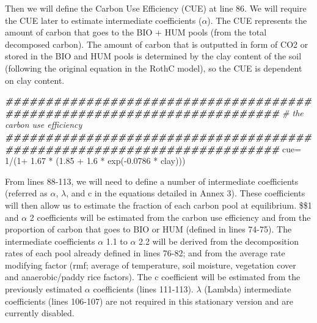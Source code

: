 \documentclass[
  10pt,
  b5paper,
]{book}
\newenvironment{Shaded}{\begin{snugshade}}{\end{snugshade}}
\newcommand{\CommentTok}[1]{\textcolor[rgb]{0.56,0.35,0.01}{\textit{#1}}}
\newcommand{\DecValTok}[1]{\textcolor[rgb]{0.00,0.00,0.81}{#1}}
\newcommand{\DocumentationTok}[1]{\textcolor[rgb]{0.56,0.35,0.01}{\textbf{\textit{#1}}}}
\newcommand{\FloatTok}[1]{\textcolor[rgb]{0.00,0.00,0.81}{#1}}
\newcommand{\FunctionTok}[1]{\textcolor[rgb]{0.00,0.00,0.00}{#1}}
\newcommand{\NormalTok}[1]{#1}
\newcommand{\OtherTok}[1]{\textcolor[rgb]{0.56,0.35,0.01}{#1}}
\newcommand{\SpecialCharTok}[1]{\textcolor[rgb]{0.00,0.00,0.00}{#1}}
\begin{document}
Then we will define the Carbon Use Efficiency (CUE) at line 86. We will require the CUE later to estimate intermediate coefficients (\(\alpha\)). The CUE represents the amount of carbon that goes to the BIO + HUM pools (from the total decomposed carbon). The amount of carbon that is outputted in form of CO2 or stored in the BIO and HUM pools is determined by the clay content of the soil (following the original equation in the RothC model), so the CUE is dependent on clay content.

\begin{Shaded}
\begin{Highlighting}[]
  \DocumentationTok{\#\#\#\#\#\#\#\#\#\#\#\#\#\#\#\#\#\#\#\#\#\#\#\#\#\#\#\#\#\#\#\#\#\#\#\#\#\#\#\#\#\#\#\#\#\#\#\#\#\#\#\#\#\#\#\#\#\#\#\#\#\#\#\#\#\#\#\#\#\#\#\#}
  \CommentTok{\# the carbon use efficiency}
  \DocumentationTok{\#\#\#\#\#\#\#\#\#\#\#\#\#\#\#\#\#\#\#\#\#\#\#\#\#\#\#\#\#\#\#\#\#\#\#\#\#\#\#\#\#\#\#\#\#\#\#\#\#\#\#\#\#\#\#\#\#\#\#\#\#\#\#\#\#\#\#\#\#\#\#\#}
\NormalTok{  cue}\OtherTok{=}  \DecValTok{1}\SpecialCharTok{/}\NormalTok{(}\DecValTok{1}\SpecialCharTok{+} \FloatTok{1.67} \SpecialCharTok{*}\NormalTok{ (}\FloatTok{1.85} \SpecialCharTok{+} \FloatTok{1.6} \SpecialCharTok{*} \FunctionTok{exp}\NormalTok{(}\SpecialCharTok{{-}}\FloatTok{0.0786} \SpecialCharTok{*}\NormalTok{ clay)))}
\end{Highlighting}
\end{Shaded}

From lines 88-113, we will need to define a number of intermediate coefficients (referred as \(\alpha\), \(\lambda\), and c in the equations detailed in Annex 3). These coefficients will then allow us to estimate the fraction of each carbon pool at equilibrium. \$\alpha\$1 and \(\alpha\) 2 coefficients will be estimated from the carbon use efficiency and from the proportion of carbon that goes to BIO or HUM (defined in lines 74-75). The intermediate coefficients \(\alpha\) 1.1 to \(\alpha\) 2.2 will be derived from the decomposition rates of each pool already defined in lines 76-82; and from the average rate modifying factor (rmf; average of temperature, soil moisture, vegetation cover and anaerobic/paddy rice factors). The c coefficient will be estimated from the previously estimated \(\alpha\) coefficients (lines 111-113). \(\lambda\) (Lambda) intermediate coefficients (lines 106-107) are not required in this stationary version and are currently disabled.
\end{document}
